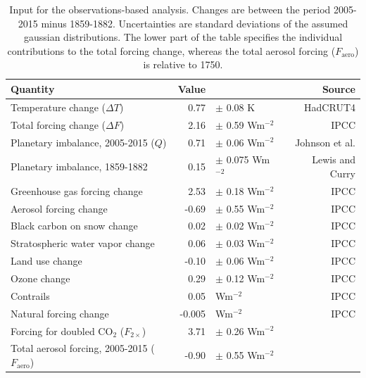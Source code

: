\documentclass[12pt]{book}
\begin{document}
\begin{table}
  \caption{Input for the observations-based analysis. Changes are between the period 2005-2015 minus 1859-1882. Uncertainties are standard deviations of the assumed gaussian distributions. The lower part of the table specifies the individual contributions to the total forcing change, whereas the total aerosol forcing ($F_\textrm{aero}$) is relative to 1750. }
  \vspace{0.5 cm}
  \centering
  \begin{tabular}{lrlr}
    \hline
    Quantity & Value &  & Source\\
    \hline
    Temperature change ($\Delta T$)     & 0.77&$\pm$ 0.08 K                  & HadCRUT4\citep{Morice:2012dw} \\
    Total forcing change ($\Delta F$)      & 2.16&$\pm$ 0.59 Wm$^{-2}$   & IPCC\citep{IPCC:2013is} \\    
    Planetary imbalance, 2005-2015 ($Q$)            & 0.71&$\pm$ 0.06 Wm$^{-2}$   & Johnson et al.\citep{Johnson:2016do} \\
    Planetary imbalance, 1859-1882                      & 0.15&$\pm$ 0.075 Wm$^{-2}$ & Lewis and Curry\citep{Lewis:2014jt} \\    
    \hline
    Greenhouse gas forcing change   & 2.53&$\pm$ 0.18 Wm$^{-2}$   & IPCC\citep{IPCC:2013is} \\    
    Aerosol forcing change                  &-0.69&$\pm$ 0.55 Wm$^{-2}$   & IPCC\citep{IPCC:2013is} \\    
    Black carbon on snow change      & 0.02&$\pm$ 0.02 Wm$^{-2}$   & IPCC\citep{IPCC:2013is} \\     
    Stratospheric water vapor change& 0.06&$\pm$ 0.03 Wm$^{-2}$   & IPCC\citep{IPCC:2013is} \\        
    Land use change                          &-0.10&$\pm$ 0.06 Wm$^{-2}$   & IPCC\citep{IPCC:2013is} \\        
    Ozone change                              & 0.29&$\pm$ 0.12 Wm$^{-2}$   & IPCC\citep{IPCC:2013is} \\        
    Contrails                                        & 0.05& Wm$^{-2}$                     & IPCC\citep{IPCC:2013is} \\        
    Natural forcing change                  & -0.005 &  Wm$^{-2}$                & IPCC\citep{IPCC:2013is} \\         
    \hline
    Forcing for doubled CO$_2$ ($F_{2\times}$)           & 3.71&$\pm$ 0.26 Wm$^{-2}$   & \\        
    Total aerosol forcing, 2005-2015 ($F_\textrm{aero}$)  &-0.90&$\pm$ 0.55 Wm$^{-2}$   & \\      
    \hline
  \end{tabular}

  \label{table:input}
\end{table}
\end{document}
